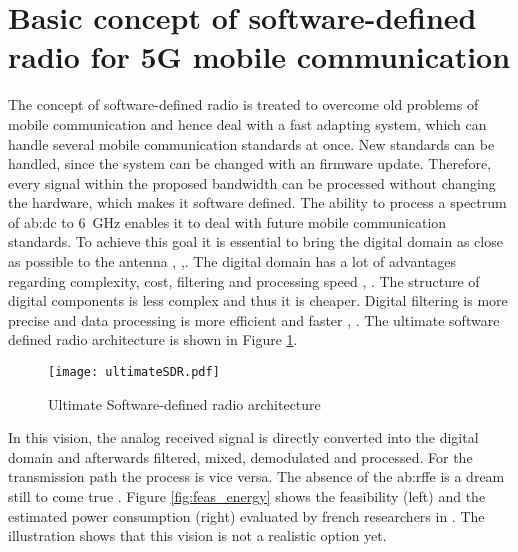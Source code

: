 \section{Basic concept of software-defined radio for 5G mobile communication}
The concept of software-defined radio is treated to overcome old problems of mobile communication and hence deal with a fast adapting system, which can handle several mobile communication standards at once. %
New standards can be handled, since the system can be changed with an firmware update. 
Therefore, every signal within the proposed bandwidth can be processed without changing the hardware, which makes it software defined.
The ability to process a spectrum of \gls{ab:dc} to \SI{6}{\giga \hertz} enables it to deal with future mobile communication standards.
To achieve this goal it is essential to bring the digital domain as close as possible to the antenna \cite{RivetDevalBegueretJ.-B.2007}, \cite{DevalRivetVeyracEtAl2013},\cite{RivetDevalJ.-B.EtAl2010}.
The digital domain has a lot of advantages regarding complexity, cost, filtering and processing speed \cite{Grossman2005}, \cite{Maroldt2010}.
The structure of digital components is less complex and thus it is cheaper.
Digital filtering is more precise and data processing is more efficient and faster \cite{Chamberlain2015}, \cite{LiRaghunathanJha2009}.
The ultimate software defined radio architecture is shown in Figure \ref{fig:ultimateSDR}.

\begin{figure}[ht]
	\centering
  \texttt{[image: ultimateSDR.pdf]}
	\caption{Ultimate Software-defined radio architecture \cite{DevalRivetVeyracEtAl2013}}
	\label{fig:ultimateSDR}
\end{figure}

In this vision, the analog received signal is directly converted into the digital domain and afterwards filtered, mixed, demodulated and processed.
For the transmission path the process is vice versa.
The absence of the \gls{ab:rffe} is a dream still to come true \cite{RivetDevalJ.-B.EtAl2010}.
Figure \ref{fig:feas_energy} shows the feasibility (left) and the estimated power consumption (right) evaluated by french researchers in \cite{RivetDevalJ.-B.EtAl2010}.
The illustration shows that this vision is not a realistic option yet.

